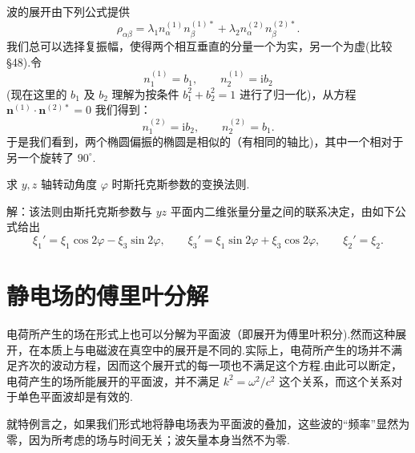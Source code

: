 \begin{xiti}
波的展开由下列公式提供
\begin{equation*}
  \rho_{\alpha\beta}=\lambda_1 n_\alpha^{(1)}n_\beta^{(1)*}
  +\lambda_2 n_\alpha^{(2)}n_\beta^{(2)*}.
\end{equation*}
我们总可以选择复振幅，使得两个相互垂直的分量一个为实，另一个为虚(比较 §48).令
\begin{equation*}
  n_1^{(1)}=b_1,\qquad n_2^{(1)}=\mathrm{i}b_2
\end{equation*}
(现在这里的 $b_1$ 及 $b_2$ 理解为按条件 $b_1^2+b_2^2 = 1$ 进行了归一化)，从方程 $\boldsymbol{n}^{(1)}\cdot\boldsymbol{n}^{(2)*} = 0$ 我们得到：
\begin{equation*}
  n_1^{(2)}=\mathrm{i}b_2,\qquad n_2^{(2)}=b_1.
\end{equation*}
于是我们看到，两个椭圆偏振的椭圆是相似的（有相同的轴比)，其中一个相对于另一个旋转了 $90^{\circ}$.

\quad 求 $y,z$ 轴转动角度 $\varphi$ 时斯托克斯参数的变换法则.

解：该法则由斯托克斯参数与 $yz$ 平面内二维张量分量之间的联系决定，由如下公式给出
\begin{equation*}
  \xi_1'=\xi_1\cos 2\varphi-\xi_3\sin 2\varphi,\qquad
  \xi_3'=\xi_1\sin 2\varphi+\xi_3\cos 2\varphi,\qquad
  \xi_2'=\xi_2.
\end{equation*}

\end{xiti}

\section{静电场的傅里叶分解}

电荷所产生的场在形式上也可以分解为平面波（即展开为傅里叶积分).然而这种展开，在本质上与电磁波在真空中的展开是不同的.实际上，电荷所产生的场并不满足齐次的波动方程，因而这个展开式的每一项也不满足这个方程.由此可以断定，电荷产生的场所能展开的平面波，并不满足 $k^2 = \omega^2/c^2$ 这个关系，而这个关系对于单色平面波却是有效的.

就特例言之，如果我们形式地将静电场表为平面波的叠加，这些波的“频率”显然为零，因为所考虑的场与时间无关；波矢量本身当然不为零.

